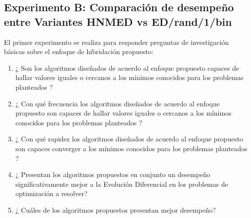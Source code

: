 \subsection{Experimento B: Comparación de desempeño entre Variantes HNMED vs ED/rand/1/bin}
El primer experimento se realiza para responder preguntas de investigación básicas sobre el enfoque de hibridación propuesto:
\begin{enumerate}
	\item ¿ Son los algoritmos diseñados de acuerdo al enfoque propuesto capaces de hallar valores iguales o cercanos a los mínimos conocidos para los problemas planteados ?
	\item ¿ Con qué frecuencia los algoritmos diseñados de acuerdo al enfoque propuesto son capaces de hallar valores iguales o cercanos a  los mínimos conocidos para los problemas planteados ?
	\item ¿ Con qué rapidez los algoritmos diseñados de acuerdo al enfoque propuesto son capaces converger a los mínimos conocidos para los problemas planteados ?
	\item ¿ Presentan los algoritmos propuestos en conjunto un desempeño significativamente mejor a la Evolución Diferencial en los problemas de optimización a resolver?
	\item ¿ Cuáles de los algoritmos propuestos presentan mejor desempeño?
\end{enumerate}
